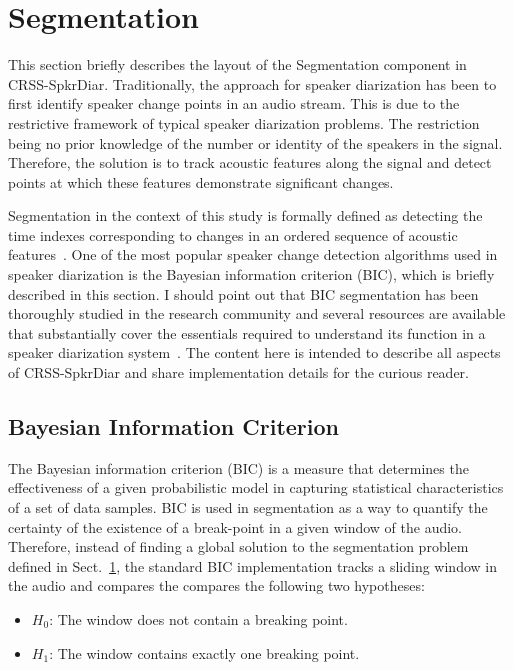 \section{Segmentation}
\label{sec:segmentation}
This section briefly describes the layout of the Segmentation component in CRSS-SpkrDiar. 
Traditionally, the approach for speaker diarization has been to first identify speaker change points in an audio stream. 
This is due to the restrictive framework of typical speaker diarization problems. 
The restriction being no prior knowledge of the number or identity of the speakers in the signal. 
Therefore, the solution is to track acoustic features along the signal and detect points at which these features demonstrate significant changes. 

Segmentation in the context of this study is formally defined as detecting the time indexes corresponding to changes in an ordered sequence of acoustic features~\cite{cettolo2005evaluation}. 
One of the most popular speaker change detection algorithms used in speaker diarization is the Bayesian information criterion (BIC), which is briefly described in this section. 
I should point out that BIC segmentation has been thoroughly studied in the research community and several resources are available that substantially cover the essentials required to understand its function in a speaker diarization system~\cite{cettolo2003efficient,cettolo2005evaluation,chen1998BIC}. 
The content here is intended to describe all aspects of CRSS-SpkrDiar and share implementation details for the curious reader. 

\subsection{Bayesian Information Criterion}
\label{ssec:chDiar_secBIC}
The Bayesian information criterion (BIC) is a measure that determines the effectiveness of a given probabilistic model in capturing statistical characteristics of a set of data samples. 
BIC is used in segmentation as a way to quantify the certainty of the existence of a break-point in a given window of the audio. 
Therefore, instead of finding a global solution to the segmentation problem defined in Sect.~\ref{sec:segmentation}, the standard BIC implementation tracks a sliding window in the audio and compares the compares the following two hypotheses: 
\begin{itemize}
	\item $H_0$: The window does not contain a breaking point. 
	\item $H_1$: The window contains exactly one breaking point. 
\end{itemize}

